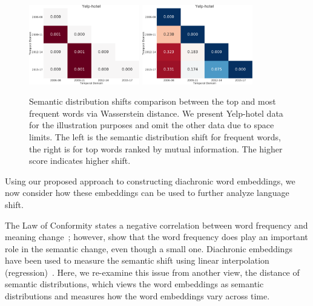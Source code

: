 \begin{figure}[tb!]
\centering
\includegraphics[width=0.43\textwidth]{images/chapter3/sm_shift/yelp_hotel_year_freq.pdf}
\includegraphics[width=0.43\textwidth]{images/chapter3/sm_shift/yelp_hotel_year_mi.pdf}
\caption{Semantic distribution shifts comparison between the top and most frequent words via Wasserstein distance. We present Yelp-hotel data for the illustration purposes and omit the other data due to space limits. The left is the semantic distribution shift for frequent words, the right is for top words ranked by mutual information. The higher score indicates higher shift.}
\label{chap3:fig:sm_shift}
\end{figure}

Using our proposed approach to constructing diachronic word embeddings,
we now consider how these embeddings can be used to further analyze language shift.

The Law of Conformity states a negative correlation between word frequency and meaning change~\cite{hamilton2016diachronic}; however, \cite{dubossarsky2017outta} show that the word frequency does play an important role in the semantic change, even though a small one. 
Diachronic embeddings have been used to measure the semantic shift using linear interpolation (regression)~\cite{hamilton2016diachronic}. 
Here, we re-examine this issue from another view, the distance of semantic distributions, which views the word embeddings as semantic distributions and measures how the word embeddings vary across time.

